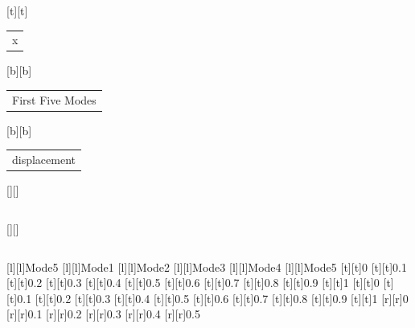 %    
%
%
\begin{psfrags}%
\psfragscanon%
%
[t][t]{\color[rgb]{0,0,0}\setlength{\tabcolsep}{0pt}\begin{tabular}{c}{x}\end{tabular}}%
[b][b]{\color[rgb]{0,0,0}\setlength{\tabcolsep}{0pt}\begin{tabular}{c}First Five Modes\end{tabular}}%
[b][b]{\color[rgb]{0,0,0}\setlength{\tabcolsep}{0pt}\begin{tabular}{c}displacement\end{tabular}}%
[][]{\color[rgb]{0,0,0}\setlength{\tabcolsep}{0pt}\begin{tabular}{c} \end{tabular}}%
[][]{\color[rgb]{0,0,0}\setlength{\tabcolsep}{0pt}\begin{tabular}{c} \end{tabular}}%
[l][l]{\color[rgb]{0,0,0}Mode5}%
[l][l]{\color[rgb]{0,0,0}Mode1}%
[l][l]{\color[rgb]{0,0,0}Mode2}%
[l][l]{\color[rgb]{0,0,0}Mode3}%
[l][l]{\color[rgb]{0,0,0}Mode4}%
[l][l]{\color[rgb]{0,0,0}Mode5}%
%
[t][t]{0}%
[t][t]{0.1}%
[t][t]{0.2}%
[t][t]{0.3}%
[t][t]{0.4}%
[t][t]{0.5}%
[t][t]{0.6}%
[t][t]{0.7}%
[t][t]{0.8}%
[t][t]{0.9}%
[t][t]{1}%
[t][t]{0}%
[t][t]{0.1}%
[t][t]{0.2}%
[t][t]{0.3}%
[t][t]{0.4}%
[t][t]{0.5}%
[t][t]{0.6}%
[t][t]{0.7}%
[t][t]{0.8}%
[t][t]{0.9}%
[t][t]{1}%
%
[r][r]{0}%
[r][r]{0.1}%
[r][r]{0.2}%
[r][r]{0.3}%
[r][r]{0.4}%
[r][r]{0.5}%

\end{psfrags}
